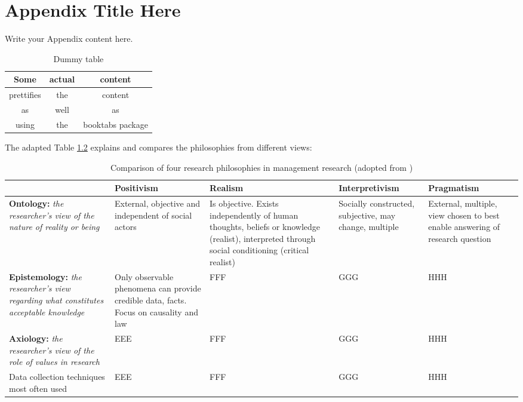
\chapter{Appendix Title Here} %

\label{AppendixA} %


Write your Appendix content here.

	\begin{table}[h!]
		\begin{center}
			\caption{Dummy table}
			\label{tbl:table2}
			\begin{tabular}{ccc}
				\toprule
				Some & actual & content\\
				\midrule
				prettifies & the & content\\
				\hline
				as & well & as\\
				\hline
				using & the & booktabs package\\
				\bottomrule
			\end{tabular}
		\end{center}
	\end{table}
	
	
	
	The adapted Table \ref{tbl:saunders} explains and compares the philosophies from different views:
	\begin{table}[h!]
		\begin{center}
			\begin{tabular}{ | p{2.8cm} | p{2.5cm} | p{2.3cm} | p{2.7cm} | p{2.5cm} |} 
				\hline
				& \textbf{Positivism} & \textbf{Realism} & \textbf{Interpretivism} & \textbf{Pragmatism} \\ \hline
				\textbf{Ontology:} \textit{the researcher's view of the nature of reality or being} & External, objective and independent of social actors & Is objective. Exists independently of human thoughts, beliefs or knowledge (realist),  interpreted through social conditioning (critical realist) & Socially constructed, subjective, may change, multiple & External, multiple, view chosen to best enable answering of research question  \\ \hline
				\textbf{Epistemology:} \textit{the researcher's view regarding what constitutes acceptable knowledge} & Only observable phenomena can provide credible data, facts. Focus on causality and law & FFF & GGG & HHH \\
				\hline
				\textbf{Axiology:} \textit{the researcher's view of the role of values in research} & EEE & FFF & GGG & HHH \\ 
				\hline
				Data collection techniques most often used & EEE & FFF & GGG & HHH \\ 
				\hline
			\end{tabular}
			\caption{Comparison of four research philosophies in management research (adopted from \cite{Saunders2009})}
			\label{tbl:saunders}
		\end{center}
	\end{table}